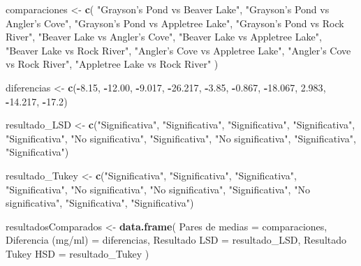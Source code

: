 \documentclass[
]{article}
\newenvironment{Shaded}{\begin{snugshade}}{\end{snugshade}}
\newcommand{\AttributeTok}[1]{\textcolor[rgb]{0.13,0.29,0.53}{#1}}
\newcommand{\FloatTok}[1]{\textcolor[rgb]{0.00,0.00,0.81}{#1}}
\newcommand{\FunctionTok}[1]{\textcolor[rgb]{0.13,0.29,0.53}{\textbf{#1}}}
\newcommand{\NormalTok}[1]{#1}
\newcommand{\OtherTok}[1]{\textcolor[rgb]{0.56,0.35,0.01}{#1}}
\newcommand{\SpecialCharTok}[1]{\textcolor[rgb]{0.81,0.36,0.00}{\textbf{#1}}}
\newcommand{\StringTok}[1]{\textcolor[rgb]{0.31,0.60,0.02}{#1}}
\begin{document}
\begin{Shaded}
\begin{Highlighting}[]
\NormalTok{comparaciones }\OtherTok{\textless{}{-}} \FunctionTok{c}\NormalTok{(}
  \StringTok{"Grayson’s Pond vs Beaver Lake"}\NormalTok{,}
  \StringTok{"Grayson’s Pond vs Angler’s Cove"}\NormalTok{,}
  \StringTok{"Grayson’s Pond vs Appletree Lake"}\NormalTok{,}
  \StringTok{"Grayson’s Pond vs Rock River"}\NormalTok{,}
  \StringTok{"Beaver Lake vs Angler’s Cove"}\NormalTok{,}
  \StringTok{"Beaver Lake vs Appletree Lake"}\NormalTok{,}
  \StringTok{"Beaver Lake vs Rock River"}\NormalTok{,}
  \StringTok{"Angler’s Cove vs Appletree Lake"}\NormalTok{,}
  \StringTok{"Angler’s Cove vs Rock River"}\NormalTok{,}
  \StringTok{"Appletree Lake vs Rock River"}
\NormalTok{)}

\NormalTok{diferencias }\OtherTok{\textless{}{-}} \FunctionTok{c}\NormalTok{(}\SpecialCharTok{{-}}\FloatTok{8.15}\NormalTok{, }\SpecialCharTok{{-}}\FloatTok{12.00}\NormalTok{, }\SpecialCharTok{{-}}\FloatTok{9.017}\NormalTok{, }\SpecialCharTok{{-}}\FloatTok{26.217}\NormalTok{, }\SpecialCharTok{{-}}\FloatTok{3.85}\NormalTok{, }\SpecialCharTok{{-}}\FloatTok{0.867}\NormalTok{, }\SpecialCharTok{{-}}\FloatTok{18.067}\NormalTok{, }\FloatTok{2.983}\NormalTok{, }\SpecialCharTok{{-}}\FloatTok{14.217}\NormalTok{, }\SpecialCharTok{{-}}\FloatTok{17.2}\NormalTok{)}

\NormalTok{resultado\_LSD }\OtherTok{\textless{}{-}} \FunctionTok{c}\NormalTok{(}\StringTok{"Significativa"}\NormalTok{, }\StringTok{"Significativa"}\NormalTok{, }\StringTok{"Significativa"}\NormalTok{, }\StringTok{"Significativa"}\NormalTok{,}
                   \StringTok{"Significativa"}\NormalTok{, }\StringTok{"No significativa"}\NormalTok{, }\StringTok{"Significativa"}\NormalTok{,}
                   \StringTok{"No significativa"}\NormalTok{, }\StringTok{"Significativa"}\NormalTok{, }\StringTok{"Significativa"}\NormalTok{)}

\NormalTok{resultado\_Tukey }\OtherTok{\textless{}{-}} \FunctionTok{c}\NormalTok{(}\StringTok{"Significativa"}\NormalTok{, }\StringTok{"Significativa"}\NormalTok{, }\StringTok{"Significativa"}\NormalTok{, }\StringTok{"Significativa"}\NormalTok{,}
                     \StringTok{"No significativa"}\NormalTok{, }\StringTok{"No significativa"}\NormalTok{, }\StringTok{"Significativa"}\NormalTok{,}
                     \StringTok{"No significativa"}\NormalTok{, }\StringTok{"Significativa"}\NormalTok{, }\StringTok{"Significativa"}\NormalTok{)}

\NormalTok{resultadosComparados }\OtherTok{\textless{}{-}} \FunctionTok{data.frame}\NormalTok{(}
  \StringTok{\textasciigrave{}}\AttributeTok{Pares de medias}\StringTok{\textasciigrave{}} \OtherTok{=}\NormalTok{ comparaciones,}
  \StringTok{\textasciigrave{}}\AttributeTok{Diferencia (mg/ml)}\StringTok{\textasciigrave{}} \OtherTok{=}\NormalTok{ diferencias,}
  \StringTok{\textasciigrave{}}\AttributeTok{Resultado LSD}\StringTok{\textasciigrave{}} \OtherTok{=}\NormalTok{ resultado\_LSD,}
  \StringTok{\textasciigrave{}}\AttributeTok{Resultado Tukey HSD}\StringTok{\textasciigrave{}} \OtherTok{=}\NormalTok{ resultado\_Tukey}
\NormalTok{)}


\end{Highlighting}
\end{Shaded}
\end{document}
